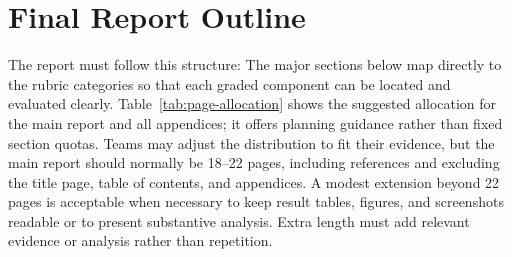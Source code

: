 \documentclass[12pt,letterpaper]{article}
\begin{document}
\section{Final Report Outline}
The report must follow this structure:
The major sections below map directly to the rubric categories so that each graded component can be located and evaluated clearly.
Table~\ref{tab:page-allocation} shows the suggested allocation for the main report and all appendices; it offers planning guidance rather than fixed section quotas. Teams may adjust the distribution to fit their evidence, but the main report should normally be 18--22 pages, including references and excluding the title page, table of contents, and appendices.
A modest extension beyond 22 pages is acceptable when necessary to keep result tables, figures, and screenshots readable or to present substantive analysis. Extra length must add relevant evidence or analysis rather than repetition.
\end{document}
